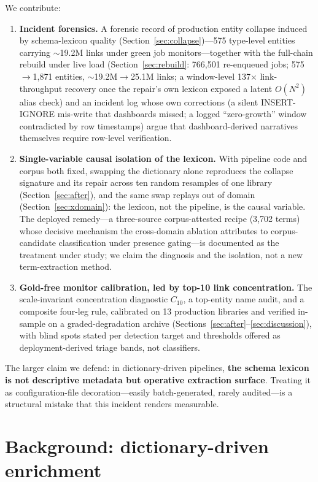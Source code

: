 \documentclass[preprint,12pt]{elsarticle}
\begin{document}
We contribute:

\begin{enumerate}
\item \textbf{Incident forensics.} A forensic record of production
entity collapse induced by schema-lexicon quality
(Section~\ref{sec:collapse})---575 type-level entities carrying
${\sim}$19.2M links under green job monitors---together with the
full-chain rebuild under live load (Section~\ref{sec:rebuild}:
766{,}501 re-enqueued jobs; 575$\to$1{,}871 entities,
${\sim}$19.2M$\to$25.1M links; a window-level 137$\times$
link-throughput recovery once the repair's own lexicon exposed a
latent $O(N^2)$ alias check) and an incident log whose own
corrections (a silent INSERT-IGNORE mis-write that dashboards missed;
a logged ``zero-growth'' window contradicted by row timestamps) argue
that dashboard-derived narratives themselves require row-level
verification.
\item \textbf{Single-variable causal isolation of the lexicon.} With
pipeline code and corpus both fixed, swapping the dictionary alone
reproduces the collapse signature and its repair across ten random
resamples of one library (Section~\ref{sec:after}), and the same swap
replays out of domain (Section~\ref{sec:xdomain}): the lexicon, not
the pipeline, is the causal variable. The deployed remedy---a
three-source corpus-attested recipe (3{,}702 terms) whose decisive
mechanism the cross-domain ablation attributes to corpus-candidate
classification under presence gating---is documented as the treatment
under study; we claim the diagnosis and the isolation, not a new
term-extraction method.
\item \textbf{Gold-free monitor calibration, led by top-10 link
concentration.} The scale-invariant concentration diagnostic
$C_{10}$, a top-entity name audit, and a composite four-leg rule,
calibrated on 13 production libraries and verified in-sample on a
graded-degradation archive
(Sections~\ref{sec:after}--\ref{sec:discussion}), with blind spots
stated per detection target and thresholds offered as
deployment-derived triage bands, not classifiers.
\end{enumerate}

The larger claim we defend: in dictionary-driven pipelines, \textbf{the
schema lexicon is not descriptive metadata but operative extraction
surface}. Treating it as configuration-file decoration---easily
batch-generated, rarely audited---is a structural mistake that this incident
renders measurable.

\section{Background: dictionary-driven enrichment}
\label{sec:background}
\end{document}
